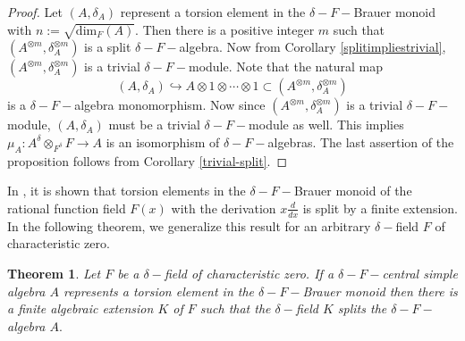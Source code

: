 \documentclass[preprint, 11pt]{amsart}
\newtheorem{theorem}{Theorem}[section]
\theoremstyle{corollary}
\theoremstyle{remark}
\theoremstyle{proposition}
\numberwithin{equation}{subsection}
\begin{document}
\begin{proof}
	Let $(A, \delta_A)$ represent a torsion element in the $\delta-F-$Brauer monoid with $n:=\sqrt{\mathrm{dim}_F(A)}.$ Then there is a positive integer $m$ such that $(A^{\otimes m}, \delta^{\otimes m}_A)$ is a split $\delta-F-$algebra. Now from Corollary \ref{splitimpliestrivial}, $(A^{\otimes m}, \delta^{\otimes m}_A)$ is a trivial $\delta-F-$module. Note that the natural map $$(A,\delta_A)\hookrightarrow A\otimes 1\otimes\cdots \otimes 1\subset (A^{\otimes m}, \delta^{\otimes m}_A)$$ is a $\delta-F-$algebra monomorphism. Now since   $(A^{\otimes m}, \delta^{\otimes m}_A)$ is a trivial $\delta-F-$module, $(A, \delta_A)$ must be a trivial $\delta-F-$module as well. This implies $\mu_A:A^{\delta}\otimes_{F^{\delta}} F\to A$ is an isomorphism of $\delta-F-$algebras. The last assertion of the proposition follows from Corollary \ref{trivial-split}.	\end{proof}
	



In \cite[Theorem 5.1]{KS-2003}, it is shown that torsion elements in the $\delta-F-$Brauer monoid of the rational function field $F(x)$ with the derivation $x\frac{d}{dx}$ is split by a finite extension.  In the following theorem, we generalize  this result for an arbitrary 
$\delta-$field $F$ of characteristic zero.
\begin{theorem} Let $F$ be a $\delta-$field of characteristic zero.
 If a $\delta-F-$central simple algebra $A$ represents a torsion element in the $\delta-F-$Brauer monoid then there is a finite algebraic extension $K$ of $F$ such that  the $\delta-$field $K$ splits the $\delta-F-$algebra $A.$
\end{theorem}
\end{document}

